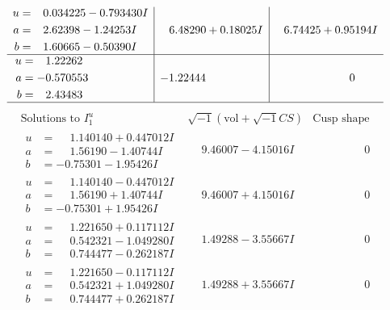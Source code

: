 \documentclass[1p]{elsarticle_modified}
\theoremstyle{definition}
\newcommand{\I}{\sqrt{-1}}
\begin{document}
$$\begin{array}{c|c|c}
\begin{aligned}
u &= \phantom{-}0.034225 - 0.793430 I \\
a &= \phantom{-}2.62398 - 1.24253 I \\
b &= \phantom{-}1.60665 - 0.50390 I\end{aligned}
 & \phantom{-}6.48290 + 0.18025 I & \phantom{-}6.74425 + 0.95194 I \\ \hline\begin{aligned}
u &= \phantom{-}1.22262\phantom{ +0.000000I} \\
a &= -0.570553\phantom{ +0.000000I} \\
b &= \phantom{-}2.43483\phantom{ +0.000000I}\end{aligned}
 & -1.22444\phantom{ +0.000000I} & \phantom{-0.000000 } 0\\
 \hline 
 \end{array}$$\newpage$$\begin{array}{c|c|c}  
\text{Solutions to }I^u_{1}& \I (\text{vol} + \sqrt{-1}CS) & \text{Cusp shape}\\
 \hline 
\begin{aligned}
u &= \phantom{-}1.140140 + 0.447012 I \\
a &= \phantom{-}1.56190 - 1.40744 I \\
b &= -0.75301 - 1.95426 I\end{aligned}
 & \phantom{-}9.46007 - 4.15016 I & \phantom{-0.000000 } 0 \\ \hline\begin{aligned}
u &= \phantom{-}1.140140 - 0.447012 I \\
a &= \phantom{-}1.56190 + 1.40744 I \\
b &= -0.75301 + 1.95426 I\end{aligned}
 & \phantom{-}9.46007 + 4.15016 I & \phantom{-0.000000 } 0 \\ \hline\begin{aligned}
u &= \phantom{-}1.221650 + 0.117112 I \\
a &= \phantom{-}0.542321 - 1.049280 I \\
b &= \phantom{-}0.744477 - 0.262187 I\end{aligned}
 & \phantom{-}1.49288 - 3.55667 I & \phantom{-0.000000 } 0 \\ \hline\begin{aligned}
u &= \phantom{-}1.221650 - 0.117112 I \\
a &= \phantom{-}0.542321 + 1.049280 I \\
b &= \phantom{-}0.744477 + 0.262187 I\end{aligned}
 & \phantom{-}1.49288 + 3.55667 I & \phantom{-0.000000 } 0 \\ \hline\begin{aligned}

\end{aligned}
\end{array}$$
\end{document}
